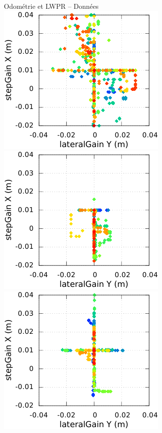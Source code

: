 \begin{frame}[noframenumbering]{Odométrie et LWPR -- Données}
    \includegraphics[type=pdf,ext=.pdf,read=.pdf,width=0.25\linewidth]{../plot/OdometryLWPR/grass_close_learn_log_walk_orders}
    \includegraphics[type=pdf,ext=.pdf,read=.pdf,width=0.25\linewidth]{../plot/OdometryLWPR/carpet_open_learn_log_walk_orders}
    \includegraphics[type=pdf,ext=.pdf,read=.pdf,width=0.25\linewidth]{../plot/OdometryLWPR/carpet_close_learn_log_walk_orders}
    \newline
\end{frame}

